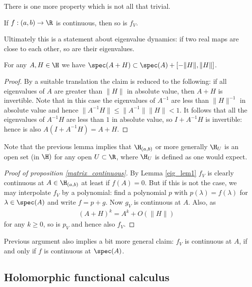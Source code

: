There is one more property which is not all that trivial.

\begin{prop}\label{matrix_continuous}
	If $f : (a, b) \to \R$ is continuous, then so is $f_{V}$.
\end{prop}

Ultimately this is a statement about eigenvalue dynamics: if two real maps are close to each other, so are their eigenvalues.
\begin{lem}\label{eig_lem1}
	For any $A, H \in \H$ we have $\spec(A + H) \subset \spec(A) + [-\|H\|, \|H\|]$.
\end{lem}
\begin{proof}
	By a suitable translation the claim is reduced to the following: if all eigenvalues of $A$ are greater than $\|H\|$ in absolute value, then $A + H$ is invertible. Note that in this case the eigenvalues of $A^{-1}$ are less than $\|H\|^{-1}$ in absolute value and hence $\|A^{-1} H\| \leq \|A^{-1}\| \|H\| < 1$. It follows that all the eigenvalues of $A^{-1} H$ are less than $1$ in absolute value, so $I + A^{-1} H$ is invertible: hence is also $A (I + A^{-1} H) = A + H$.
\end{proof}

Note that the previous lemma implies that $\H_{(a, b)}$ or more generally $\H_{U}$ is an open set (in $\H)$ for any open $U \subset \R$, where $\H_{U}$ is defined as one would expect.

\begin{proof}[Proof of proposition \ref{matrix_continuous}]
	By Lemma \ref{eig_lem1} $f_{V}$ is clearly continuous at $A \in \H_{(a, b)}$ at least if $f(A) = 0$. But if this is not the case, we may interpolate $f_{V}$ by a polynomial: find a polynomial $p$ with $p(\lambda) = f(\lambda)$ for $\lambda \in \spec(A)$ and write $f = p + g$. Now $g_{V}$ is continuous at $A$. Also, as
	\begin{align*}
		(A + H)^{k} = A^{k} + O(\|H\|)
	\end{align*}
	for any $k \geq 0$, so is $p_{V}$ and hence also $f_{V}$.
\end{proof}

Previous argument also implies a bit more general claim: $f_{V}$ is continuous at $A$, if and only if $f$ is continuous at $\spec(A)$.

\subsection{Holomorphic functional calculus}

